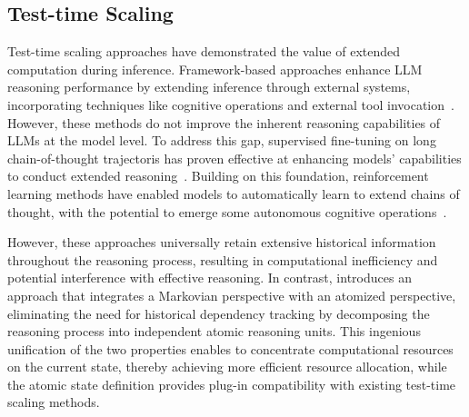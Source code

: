 \subsection{Test-time Scaling}
Test-time scaling approaches have demonstrated the value of extended computation during inference. Framework-based approaches enhance LLM reasoning performance by extending inference through external systems, incorporating techniques like cognitive operations and external tool invocation~\cite{Zhang2024aflow, Falcon2024archon, Chen2024more}. However, these methods do not improve the inherent reasoning capabilities of LLMs at the model level. To address this gap, supervised fine-tuning on long chain-of-thought trajectoris has proven effective at enhancing models' capabilities to conduct extended reasoning~\cite{ye2025limo, yeo2025demystifying, yao2025unveiling}. Building on this foundation, reinforcement learning methods have enabled models to automatically learn to extend chains of thought, with the potential to emerge some autonomous cognitive operations~\cite{team2025kimi, zeng2025simplerl, deepseekR1Model, yu2025dapo}.

However, these approaches universally retain extensive historical information throughout the reasoning process, resulting in computational inefficiency and potential interference with effective reasoning. In contrast, \our introduces an approach that integrates a Markovian perspective with an atomized perspective, eliminating the need for historical dependency tracking by decomposing the reasoning process into independent atomic reasoning units. This ingenious unification of the two properties enables \our to concentrate computational resources on the current state, thereby achieving more efficient resource allocation, while the atomic state definition provides plug-in compatibility with existing test-time scaling methods.